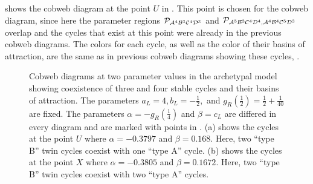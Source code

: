 shows the cobweb diagram at the point $U$ in .
This point is chosen for the cobweb diagram, since here the parameter regions $\mathcal{P}_{\mathcal{A}^4\mathcal{B}^3\mathcal{C}^4\mathcal{D}^3}$ and $\mathcal{P}_{\mathcal{A}^5\mathcal{B}^3\mathcal{C}^4\mathcal{D}^4, \mathcal{A}^4\mathcal{B}^4\mathcal{C}^5\mathcal{D}^3}$ overlap and the cycles that exist at this point were already in the previous cobweb diagrams.
The colors for each cycle, as well as the color of their basins of attraction, are the same as in previous cobweb diagrams showing these cycles, .

\begin{figure}
	\centering
	\caption[Cobweb diagrams at two parameter values in the archetypal model showing coexistence of three and four stable cycles and their basins of attraction]{
		Cobweb diagrams at two parameter values in the archetypal model showing coexistence of three and four stable cycles and their basins of attraction.
		The parameters $a_L = 4, b_L = -\frac{1}{2},$ and $g_R\left(\frac{1}{2}\right) = \frac{1}{2} + \frac{1}{40}$ are fixed.
		The parameters $\alpha = -g_R\left(\frac{1}{4}\right)$ and $\beta = c_L$ are differed in every diagram and are marked with points in .
		(a) shows the cycles at the point $U$ where $\alpha = -0.3797$ and $\beta = 0.168$.
		Here, two ``type B'' twin cycles coexist with one ``type A'' cycle.
		(b) shows the cycles at the point $X$ where $\alpha = -0.3805$ and $\beta = 0.1672$.
		Here, two ``type B'' twin cycles coexist with two ``type A'' cycles.
	}
\end{figure}

